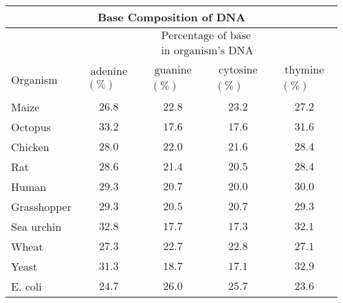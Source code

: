 \begin{tabular}{|l|c|c|c|c|}
\hline \multicolumn{5}{|c|}{ Base Composition of DNA } \\
\hline & \multicolumn{4}{|c|}{$\begin{gathered}\text { Percentage of base } \\
\text { in organism's DNA }\end{gathered}$} \\
\cline { 2 - 5 } Organism & $\begin{gathered}\text { adenine } \\
(\%)\end{gathered}$ & $\begin{gathered}\text { guanine } \\
(\%)\end{gathered}$ & $\begin{gathered}\text { cytosine } \\
(\%)\end{gathered}$ & $\begin{gathered}\text { thymine } \\
(\%)\end{gathered}$ \\
\hline Maize & $26.8$ & $22.8$ & $23.2$ & $27.2$ \\
\hline Octopus & $33.2$ & $17.6$ & $17.6$ & $31.6$ \\
\hline Chicken & $28.0$ & $22.0$ & $21.6$ & $28.4$ \\
\hline Rat & $28.6$ & $21.4$ & $20.5$ & $28.4$ \\
\hline Human & $29.3$ & $20.7$ & $20.0$ & $30.0$ \\
\hline Grasshopper & $29.3$ & $20.5$ & $20.7$ & $29.3$ \\
\hline Sea urchin & $32.8$ & $17.7$ & $17.3$ & $32.1$ \\
\hline Wheat & $27.3$ & $22.7$ & $22.8$ & $27.1$ \\
\hline Yeast & $31.3$ & $18.7$ & $17.1$ & $32.9$ \\
\hline E. coli & $24.7$ & $26.0$ & $25.7$ & $23.6$ \\
\hline
\end{tabular}